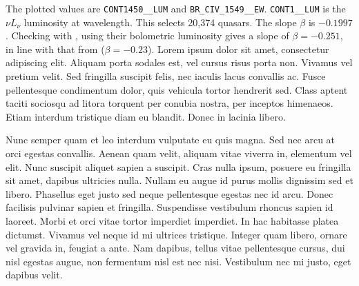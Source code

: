 \documentclass[a4paper,fleqn,usenatbib]{mnras}
\begin{document}
The plotted values are \verb|CONT1450__LUM| and
\verb|BR_CIV_1549__EW|.  \verb|CONT1__LUM| is the $\nu L_{\nu}$
luminosity at wavelength. This selects 20,374 quasars.  The slope
$\beta$ is $-0.1997$.  Checking with \citet{Kozlowski2017}, using
their bolometric luminosity gives a slope of $\beta=-0.251$, in line
with that from \citet{Hamann2017} ($\beta=-0.23$).
Lorem ipsum dolor sit amet, consectetur adipiscing elit. Aliquam porta
sodales est, vel cursus risus porta non. Vivamus vel pretium
velit. Sed fringilla suscipit felis, nec iaculis lacus convallis
ac. Fusce pellentesque condimentum dolor, quis vehicula tortor
hendrerit sed. Class aptent taciti sociosqu ad litora torquent per
conubia nostra, per inceptos himenaeos. Etiam interdum tristique diam
eu blandit. Donec in lacinia libero.

Nunc semper quam et leo interdum vulputate eu quis magna. Sed nec arcu
at orci egestas convallis. Aenean quam velit, aliquam vitae viverra
in, elementum vel elit. Nunc suscipit aliquet sapien a suscipit. Cras
nulla ipsum, posuere eu fringilla sit amet, dapibus ultricies
nulla. Nullam eu augue id purus mollis dignissim sed et
libero. Phasellus eget justo sed neque pellentesque egestas nec id
arcu. Donec facilisis pulvinar sapien et fringilla. Suspendisse
vestibulum rhoncus sapien id laoreet. Morbi et orci vitae tortor
imperdiet imperdiet. In hac habitasse platea dictumst. Vivamus vel
neque id mi ultrices tristique. Integer quam libero, ornare vel
gravida in, feugiat a ante. Nam dapibus, tellus vitae pellentesque
cursus, dui nisl egestas augue, non fermentum nisl est nec
nisi. Vestibulum nec mi justo, eget dapibus velit.
\end{document}
